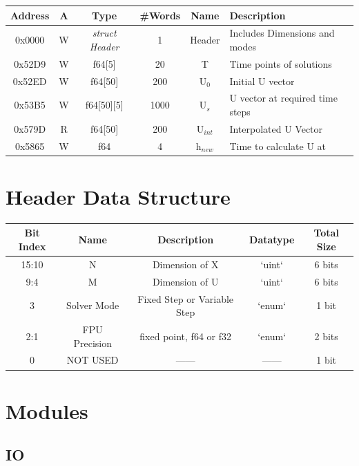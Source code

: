 \documentclass[12pt]{report}
\begin{document}
\begin{center}
 \begin{tabular}{||c |c| c| c| c| l||} 
 \hline
 Address & A & Type & \#Words & Name & Description  \\ [0.5ex] 
 \hline\hline
  0x0000 & W & \emph{struct Header} & 1 & Header & Includes Dimensions and modes  \\ 
 \hline
 0x52D9  & W & f64[5] & 20 & T & Time points of solutions  \\
 \hline
 0x52ED  & W & f64[50] & 200 & U$_0$ & Initial U vector \\
 \hline
 0x53B5  & W & f64[50][5] & 1000 & U$_s$ & U vector at required time steps \\
 \hline
 0x579D  & R & f64[50] & 200 & U$_{int}$ & Interpolated U Vector \\
 \hline
 0x5865  & W & f64 & 4 & h$_{new}$ & Time to calculate U at \\ [1ex]
 \hline
\end{tabular}
\end{center}

\section{Header Data Structure}

\begin{center}
 \begin{tabular}{||c c c c c||} 
 \hline
 Bit Index & Name & Description & Datatype & Total Size \\ [0.5ex] 
 \hline\hline
  15:10 & N & Dimension of X  & `uint` & 6 bits  \\ 
 \hline
 9:4 & M & Dimension of U  & `uint` & 6 bits  \\ 
 \hline
 3 & Solver Mode & Fixed Step or Variable Step  & `enum` & 1 bit \\ 
 \hline
 2:1 & FPU Precision & fixed point, f64 or f32 & `enum` & 2 bits  \\ 
 \hline
 0  & NOT USED &  ------ & ------ & 1 bit \\ [1ex] 
 \hline
\end{tabular}
\end{center}

\section{Modules}

\subsection{IO}
\end{document}
